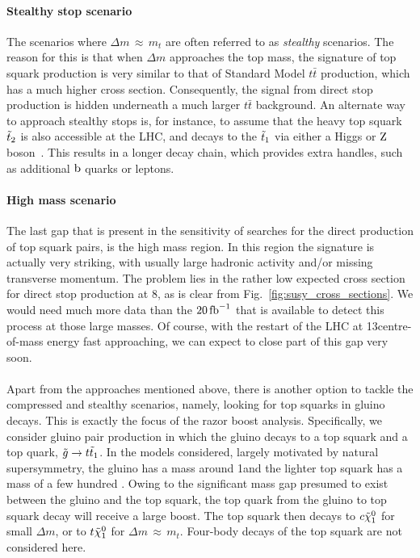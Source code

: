 \paragraph{Stealthy stop scenario}
The scenarios where $\Delta m\,{\approx}\, m_t$ are often referred to as \textit{stealthy}
scenarios. The reason for this is that when $\Delta m$ approaches the top mass, the signature of
top squark production is very similar to that of Standard Model $t\bar{t}$ production,
which has a much higher cross section. Consequently, the signal from direct stop production is
hidden underneath a much larger $t\bar{t}$ background. An alternate way to approach stealthy stops
is, for instance, to assume that the heavy top squark $\tilde{t}_2$ is also accessible at the LHC, and
decays to the $\tilde{t}_1$ via either a Higgs or $\mathrm{Z}$ boson~\cite{Khachatryan:2014doa}. This
results in a longer decay chain, which provides extra handles, such as additional $\mathrm{b}$ quarks or
leptons. 

\paragraph{High mass scenario}
The last gap that is present in the sensitivity of searches for the direct production of top squark
pairs, is the high mass region. In this region the signature is actually very striking, with
usually large hadronic activity and/or missing transverse momentum. The problem lies in the rather
low expected cross section for direct stop production at 8\TeV, as is clear from
Fig.~\ref{fig:susy_cross_sections}. We would need much more data than
the $20\mbox{\ensuremath{\,\text{fb}^\text{$-$1}}}$ that is available to detect this process at those large masses. 
Of course, with the restart of the LHC at 13\TeV centre-of-mass energy fast approaching, we can
expect to close part of this gap very soon.

\paragraph{}
Apart from the approaches mentioned above, there is another option to tackle the compressed and
stealthy scenarios, namely, looking for top squarks in gluino decays. This is exactly the focus of
the razor boost analysis. 
Specifically, we consider gluino pair production in which the gluino decays to a top squark and a
top quark, $\tilde{g} \rightarrow t \tilde{t}_1$. In the models considered, largely motivated by
natural supersymmetry, the gluino has a mass around 1\TeV and the lighter top squark has a mass
of a few hundred \GeV. Owing to the significant mass gap presumed to exist between the gluino and
the top squark, the top quark from the gluino to top squark decay will receive a large boost.  
The top squark then decays to $c \tilde{\chi}_1^0$ for small $\Delta m$, or to $t \tilde{\chi}_1^0$ for $\Delta m
\,{\approx}\, m_t$. Four-body decays of the top squark are not considered here. 

